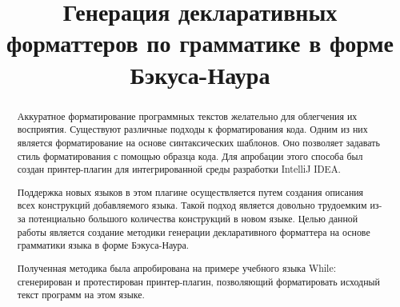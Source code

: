 \documentclass[conference]{IEEEtran}
\begin{document}
%
%
\title{Генерация декларативных форматтеров по грамматике в форме Бэкуса-Наура}


\author{
\and
{}
}

\maketitle

\begin{abstract}


Аккуратное форматирование программных текстов желательно для облегчения их восприятия. 
Существуют различные 
подходы к форматирования кода. 
Одним из них является форматирование на основе синтаксических шаблонов. 
Оно позволяет задавать стиль форматирования с помощью образца кода. %
Для апробации этого способа был создан принтер-плагин%
\cite{podkopaevDiploma} для интегрированной среды разработки IntelliJ IDEA.

Поддержка новых языков в этом плагине осуществляется путем создания описания всех конструкций добавляемого языка.
Такой подход является довольно трудоемким из-за потенциально большого количества конструкций в новом языке.
Целью данной работы является создание методики генерации декларативного форматтера на основе грамматики языка в форме Бэкуса-Наура.

Полученная методика была апробирована на примере учебного языка While: сгенерирован и протестирован принтер-плагин, позволяющий форматировать исходный текст программ на этом языке. 
\end{abstract}
\end{document}
